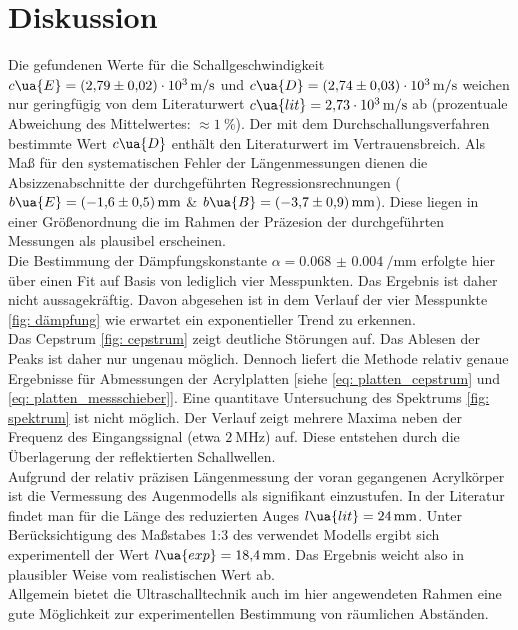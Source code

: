 \newpage
\section{Diskussion}
Die gefundenen Werte für die Schallgeschwindigkeit $c\ua{E} = \SI{+2.79(2)e+03}{\meter\per\second}$ und
$c\ua{D} = \SI{+2.74(3)e+03}{\meter\per\second}$ weichen nur geringfügig von dem Literaturwert
$c\ua{lit} = \SI{2.73e3}{\meter\per\second}$ ab (prozentuale Abweichung des Mittelwertes: $\approx \SI{1}{\percent}$). %
Der mit dem Durchschallungsverfahren bestimmte Wert $c\ua{D}$
enthält den Literaturwert im Vertrauensbreich. Als Maß für den systematischen Fehler der Längenmessungen dienen
die Absizzenabschnitte der durchgeführten Regressionsrechnungen ($b\ua{E} = \SI{-1.6(5)}{\milli\meter}$ \&
$b\ua{B} = \SI{-3.7(9)}{\milli\meter}$). Diese liegen in einer Größenordnung die im Rahmen der Präzesion
der durchgeführten Messungen als plausibel erscheinen. \\
Die Bestimmung der Dämpfungskonstante $\alpha = \SI{0.068(4)}{\per\milli\meter}$ erfolgte hier über einen Fit
auf Basis von lediglich vier Messpunkten. Das Ergebnis ist daher nicht aussagekräftig. Davon abgesehen ist in
dem Verlauf der vier Messpunkte \ref{fig: dämpfung} wie erwartet ein exponentieller Trend zu erkennen.\\
Das Cepstrum \ref{fig: cepstrum} zeigt deutliche Störungen auf. Das Ablesen der Peaks ist daher nur ungenau möglich.
Dennoch liefert die Methode relativ genaue Ergebnisse für Abmessungen der Acrylplatten [siehe \ref{eq: platten_cepstrum} und \ref{eq: platten_messschieber}].
Eine quantitave Untersuchung des Spektrums \ref{fig: spektrum} ist nicht möglich. Der Verlauf zeigt mehrere %
Maxima neben der Frequenz des Eingangssignal (etwa $\SI{2}{\mega\hertz}$) auf. Diese entstehen durch die Überlagerung der
reflektierten Schallwellen. \\
Aufgrund der relativ präzisen Längenmessung der voran gegangenen Acrylkörper ist die Vermessung des Augenmodells als
signifikant einzustufen. In der Literatur \cite{sehen} findet man für die Länge des reduzierten Auges $l\ua{lit} = \SI{24}{\milli\meter}$. Unter
Berücksichtigung des Maßstabes 1:3 des verwendet Modells ergibt sich experimentell der Wert $l\ua{exp} = \SI{18.4}{\milli\meter}$. Das Ergebnis
weicht also in plausibler Weise vom realistischen Wert ab. \\
Allgemein bietet die Ultraschalltechnik auch im hier angewendeten Rahmen eine gute Möglichkeit zur experimentellen Bestimmung
von räumlichen Abständen.
